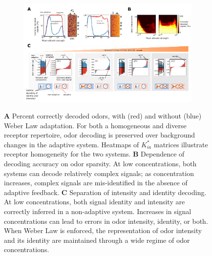 \begin{figure}
	\centering
	\begin{subfigure}[t]{\linewidth}
		\includegraphics[width=\textwidth]{figures/Figures_signal_decoding_weber_law}
		\phantomsubcaption
		\label{fig:decoding_a}
	\end{subfigure}
	\begin{subfigure}[t]{0\linewidth}
		\label{fig:decoding_b}
	\end{subfigure}
	\begin{subfigure}[t]{0\linewidth}
		\label{fig:decoding_c}
	\end{subfigure}
	\caption{\footnotesize{\textbf{A} Percent correctly decoded odors, with (red) and without (blue) Weber Law adaptation. For both a homogeneous and diverse receptor repertoire, odor decoding is preserved over background changes in the adaptive system. Heatmaps of $K^*_{ia}$ matrices illustrate receptor homogeneity for the two systems. \textbf{B} Dependence of decoding accuracy on odor sparsity. At low concentrations, both systems can decode relatively complex signals; as concentration increases, complex signals are mis-identified in the absence of adaptive feedback. \textbf{C} Separation of intensity and identity decoding. At low concentrations, both signal identity and intensity are correctly inferred in a non-adaptive system. Increases in signal concentrations can lead to errors in odor intensity, identity, or both. When Weber Law is enforced, the representation of odor intensity and its identity are maintained through a wide regime of odor concentrations.}}
	\label{fig:decoding}
\end{figure}



